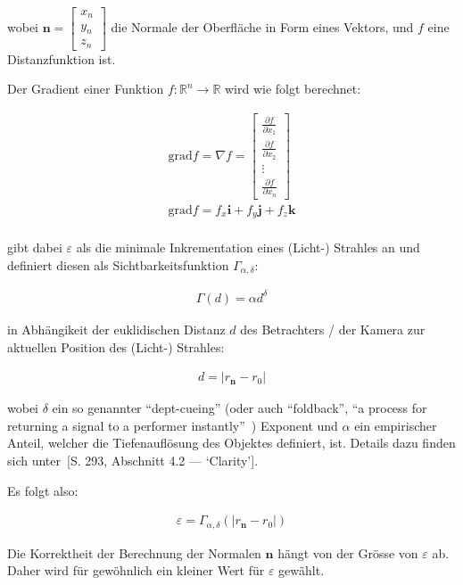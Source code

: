 wobei $\bm{n} = \begin{bmatrix} x_{n} \\ y_{n} \\ z_{n} \end{bmatrix}$
die Normale der Oberfläche in Form eines Vektors, und $f$ eine
Distanzfunktion ist.

Der Gradient einer Funktion $f: \mathbb{R}^{n} \to \mathbb{R}$ wird wie
folgt berechnet:

\begin{gather}
    \text{grad} f = \nabla f = \begin{bmatrix}
        \frac{\partial f}{\partial x_{1}} \\
        \frac{\partial f}{\partial x_{2}} \\
        \vdots \\
        \frac{\partial f}{\partial x_{n}} 
    \end{bmatrix}\\
    \text{grad} f = f_{x}\bm{i} + f_{y}\bm{j} + f_{z}\bm{k}\\
\end{gather}

\cite{hart_ray_1989} gibt dabei $\varepsilon$ als die minimale
Inkrementation eines (Licht-) Strahles an und definiert diesen als
Sichtbarkeitsfunktion $\Gamma_{\alpha, \delta}$:

\begin{gather}
    \Gamma(d) = \alpha d^{\delta}
\end{gather}

in Abhängikeit der euklidischen Distanz
$d$ des Betrachters / der Kamera zur aktuellen Position des (Licht-)
Strahles:

\begin{gather}
    d = |r_{\bm{n}} - r_{0}|
\end{gather}

wobei $\delta$ ein so genannter ``dept-cueing'' (oder auch ``foldback'',
``a process for returning a signal to a performer
instantly''~\cite{_collins_2015}) Exponent und $\alpha$ ein empirischer
Anteil, welcher die Tiefenauflösung des Objektes definiert, ist.
Details dazu finden sich unter~\cite{hart_ray_1989}[S. 293, Abschnitt
4.2 --- `Clarity'].

Es folgt also:

\begin{gather}
    \varepsilon = \Gamma_{\alpha, \delta}(|r_{\bm{n}} - r_0|)
\end{gather}

Die Korrektheit der Berechnung der Normalen $\bm{n}$ hängt von der
Grösse von $\varepsilon$ ab. Daher wird für gewöhnlich ein kleiner Wert
für $\varepsilon$ gewählt.

